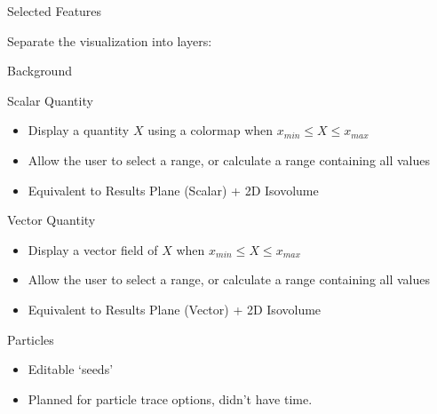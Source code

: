 \begin{frame}{Selected Features}

        Separate the visualization into layers:
        \vspace{1em}

        \begin{wideitemize}
            \item Background
            \item Scalar Quantity
            \begin{itemize}
                \item Display a quantity $X$ using a colormap when $x_{min} \leq X \leq x_{max}$
                \item Allow the user to select a range, or calculate a range containing all values
                \item Equivalent to Results Plane (Scalar) + 2D Isovolume
            \end{itemize}
            \item Vector Quantity 
            \begin{itemize}
                \item Display a vector field of $X$ when $x_{min} \leq X \leq x_{max}$
                \item Allow the user to select a range, or calculate a range containing all values
                \item Equivalent to Results Plane (Vector) + 2D Isovolume
            \end{itemize}
            \item Particles
                \begin{itemize}
                    \item Editable `seeds'
                    \item Planned for particle trace options, didn't have time.
                \end{itemize}
        \end{wideitemize}
\end{frame}

